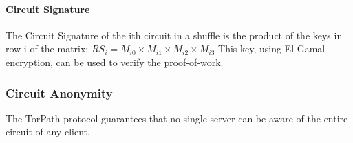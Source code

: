 

\paragraph{Circuit Signature}
The Circuit Signature of the ith circuit in a shuffle is the product of the keys
in row i of the matrix:
$RS_i = M_{i0} \times M_{i1} \times M_{i2} \times M_{i3}$
This key, using El Gamal encryption, can be used to verify the proof-of-work.

\subsubsection{Circuit Anonymity} 
The TorPath protocol guarantees that no single server can be aware of the entire
circuit of any client. 


